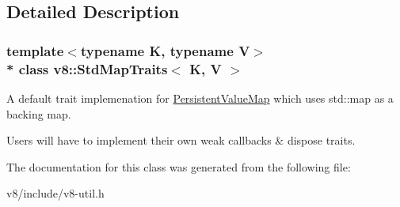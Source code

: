 \subsection{Detailed Description}
\subsubsection*{template$<$typename K, typename V$>$\\*
class v8\+::\+Std\+Map\+Traits$<$ K, V $>$}

A default trait implemenation for \hyperlink{classv8_1_1PersistentValueMap}{Persistent\+Value\+Map} which uses std\+::map as a backing map.

Users will have to implement their own weak callbacks \& dispose traits. 

The documentation for this class was generated from the following file\+:\begin{DoxyCompactItemize}
\item 
v8/include/v8-\/util.\+h\end{DoxyCompactItemize}
